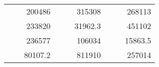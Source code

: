 \begin{table}[H]
\begin{tabular}{|ccrccrccc}
\rowcolor[HTML]{DAE8FC} 
\multicolumn{1}{|c|}{\cellcolor[HTML]{FFFFC7}}                                & \multicolumn{1}{c|}{\cellcolor[HTML]{DAE8FC}}                      & \multicolumn{1}{r|}{\cellcolor[HTML]{DAE8FC}200486}    & \multicolumn{1}{c|}{\cellcolor[HTML]{FFFFC7}}                                & \multicolumn{1}{c|}{\cellcolor[HTML]{DAE8FC}}                       & \multicolumn{1}{r|}{\cellcolor[HTML]{DAE8FC}315308}    & \multicolumn{1}{c|}{\cellcolor[HTML]{FFFFC7}}                                & \multicolumn{1}{c|}{\cellcolor[HTML]{DAE8FC}}                      & \multicolumn{1}{r|}{\cellcolor[HTML]{DAE8FC}268113}    \\ \cline{3-3} \cline{6-6} \cline{9-9} 
\multicolumn{1}{|c|}{\cellcolor[HTML]{FFFFC7}}                                & \multicolumn{1}{c|}{\cellcolor[HTML]{DAE8FC}}                      & \multicolumn{1}{r|}{\cellcolor[HTML]{DDFDFF}233820}    & \multicolumn{1}{c|}{\cellcolor[HTML]{FFFFC7}}                                & \multicolumn{1}{c|}{\cellcolor[HTML]{DAE8FC}}                       & \multicolumn{1}{r|}{\cellcolor[HTML]{DDFDFF}31962.3}   & \multicolumn{1}{c|}{\cellcolor[HTML]{FFFFC7}}                                & \multicolumn{1}{c|}{\cellcolor[HTML]{DAE8FC}}                      & \multicolumn{1}{r|}{\cellcolor[HTML]{DDFDFF}451102}    \\ \cline{3-3} \cline{6-6} \cline{9-9} 
\rowcolor[HTML]{DAE8FC} 
\multicolumn{1}{|c|}{\cellcolor[HTML]{FFFFC7}}                                & \multicolumn{1}{c|}{\cellcolor[HTML]{DAE8FC}}                      & \multicolumn{1}{r|}{\cellcolor[HTML]{DAE8FC}236577}    & \multicolumn{1}{c|}{\cellcolor[HTML]{FFFFC7}}                                & \multicolumn{1}{c|}{\cellcolor[HTML]{DAE8FC}}                       & \multicolumn{1}{r|}{\cellcolor[HTML]{DAE8FC}106034}    & \multicolumn{1}{c|}{\cellcolor[HTML]{FFFFC7}}                                & \multicolumn{1}{c|}{\cellcolor[HTML]{DAE8FC}}                      & \multicolumn{1}{r|}{\cellcolor[HTML]{DAE8FC}15863.5}   \\ \cline{3-3} \cline{6-6} \cline{9-9} 
\multicolumn{1}{|c|}{\cellcolor[HTML]{FFFFC7}}                                & \multicolumn{1}{c|}{\cellcolor[HTML]{DAE8FC}}                      & \multicolumn{1}{r|}{\cellcolor[HTML]{DDFDFF}80107.2}   & \multicolumn{1}{c|}{\cellcolor[HTML]{FFFFC7}}                                & \multicolumn{1}{c|}{\cellcolor[HTML]{DAE8FC}}                       & \multicolumn{1}{r|}{\cellcolor[HTML]{DDFDFF}811910}    & \multicolumn{1}{c|}{\cellcolor[HTML]{FFFFC7}}                                & \multicolumn{1}{c|}{\cellcolor[HTML]{DAE8FC}}                      & \multicolumn{1}{r|}{\cellcolor[HTML]{DDFDFF}257014}    \\ \cline{3-3} \cline{6-6} \cline{9-9} 

\end{tabular}
\end{table}
